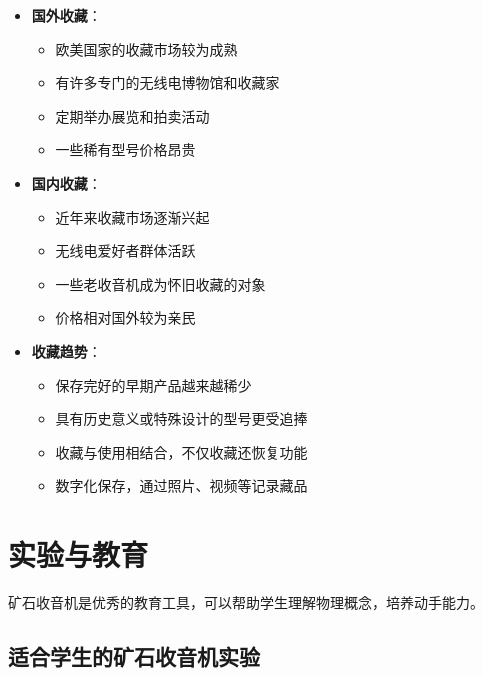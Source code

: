 \documentclass[12pt,UTF8]{ctexbook}
\begin{document}
\begin{itemize}[leftmargin=3.5em]
    \item \textbf{国外收藏}：
        \begin{itemize}[leftmargin=3.5em]
            \item 欧美国家的收藏市场较为成熟
            \item 有许多专门的无线电博物馆和收藏家
            \item 定期举办展览和拍卖活动
            \item 一些稀有型号价格昂贵
        \end{itemize}
    \item \textbf{国内收藏}：
        \begin{itemize}[leftmargin=3.5em]
            \item 近年来收藏市场逐渐兴起
            \item 无线电爱好者群体活跃
            \item 一些老收音机成为怀旧收藏的对象
            \item 价格相对国外较为亲民
        \end{itemize}
    \item \textbf{收藏趋势}：
        \begin{itemize}[leftmargin=3.5em]
            \item 保存完好的早期产品越来越稀少
            \item 具有历史意义或特殊设计的型号更受追捧
            \item 收藏与使用相结合，不仅收藏还恢复功能
            \item 数字化保存，通过照片、视频等记录藏品
        \end{itemize}
\end{itemize}

\section{实验与教育}

矿石收音机是优秀的教育工具，可以帮助学生理解物理概念，培养动手能力。

\subsection{适合学生的矿石收音机实验}
\end{document}
